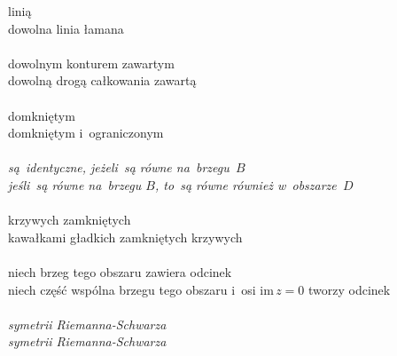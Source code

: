 \documentclass[a4paper,11pt]{article}
\begin{document}
\Jest linią \\
\Pow dowolna linia łamana \\
 \\
\Jest dowolnym konturem zawartym \\
\Pow  dowolną drogą całkowania zawartą \\
 \\
\Jest domkniętym \\
\Pow  domkniętym i~ograniczonym \\
 \\
\Jest \emph{są~identyczne, jeżeli~są równe na~brzegu~$B$} \\
\Pow \emph{jeśli~są równe na~brzegu $B$, to~są równe również
  w~obszarze~$D$} \\
 \\
\Jest krzywych zamkniętych \\
\Pow  kawałkami gładkich zamkniętych krzywych \\
 \\
\Jest niech brzeg tego obszaru zawiera odcinek \\
\Pow niech część wspólna brzegu tego obszaru i~osi
$\textrm{im}\, z = 0$
tworzy odcinek \\
 \\
\Jest \emph{symetrii{ }{ } Riemanna-Schwarza} \\
\Pow \emph{symetrii Riemanna-Schwarza}

\vspace{\spaceTwo}











 {}




\end{document}
